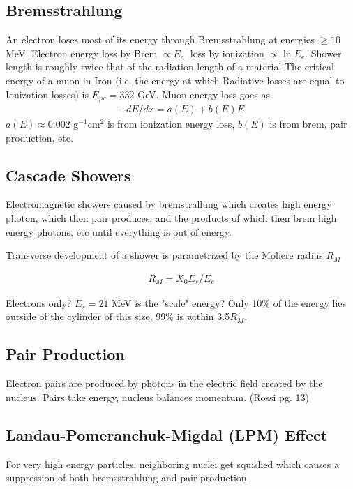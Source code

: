 \subsection{Bremsstrahlung}
 An electron loses most of its energy through Bremsstrahlung at energies $\ge 10$ MeV. Electron energy loss by Brem $\propto E_e$, loss by ionization $\propto \ln E_e$. Shower length is roughly twice that of the radiation length of a material \cite{pdg} The critical energy of a muon in Iron (i.e. the energy at which Radiative losses are equal to Ionization losses) is $E_{\mu c} = 332$ GeV. Muon energy loss goes as 
 \begin{align}
 -dE/dx = a(E) + b(E)E
 \end{align}
 $a(E)\approx 0.002$ g$^{-1}$cm$^2$ is from ionization energy loss, $b(E)$ is from brem, pair production, etc.
\subsection{Cascade Showers}

Electromagnetic showers caused by bremstrallung which creates high energy photon, which then pair produces, and the products of which then brem high energy photons, etc until everything is out of energy.

Transverse development of a shower is parametrized by the Moliere radius $R_M$


\begin{align}
R_M = X_0E_s/E_c
\end{align}

Electrons only? $E_s = 21$ MeV is the "scale" energy? Only 10$\%$ of the energy lies outside of the cylinder of this size, $99\%$ is within 3.5$R_M$. 

\subsection{Pair Production}
Electron pairs are produced by photons in the electric field created by the nucleus. Pairs take energy, nucleus balances momentum. (Rossi pg. 13)

\subsection{Landau-Pomeranchuk-Migdal (LPM) Effect}
For very high energy particles, neighboring nuclei get squished which causes a suppression of both bremsstrahlung and pair-production.



